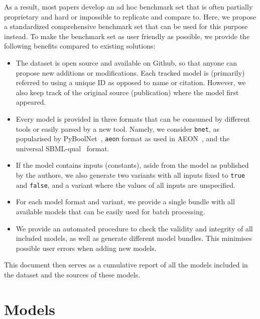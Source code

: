\documentclass{article}
\begin{document}
As a result, most papers develop an ad hoc benchmark set that is often partially proprietary and hard or impossible to replicate and compare to. Here, we propose a standardized comprehensive benchmark set that can be used for this purpose instead. To make the benchmark set as user friendly as possible, we provide the following benefits compared to existing solutions:

\begin{itemize}
	\item The dataset is open source and available on Github, so that anyone can propose new additions or modifications. Each tracked model is (primarily) referred to using a unique ID as opposed to name or citation. However, we also keep track of the original source (publication) where the model first appeared.
	
	\item Every model is provided in three formats that can be consumed by different tools or easily parsed by a new tool. Namely, we consider \texttt{bnet}, as popularised by PyBoolNet~\cite{pyboolnet}, \texttt{aeon} format as used in AEON~\cite{aeon}, and the universal SBML-qual~\cite{sbml-qual} format.
	
	\item If the model contains inputs (constants), aside from the model as published by the authors, we also generate two variants with all inputs fixed to \texttt{true} and \texttt{false}, and a variant where the values of all inputs are unspecified.
	
	\item For each model format and variant, we provide a single bundle with all available models that can be easily used for batch processing.
	
	\item We provide an automated procedure to check the validity and integrity of all included models, as well as generate different model bundles. This minimises possible user errors when adding new models.
\end{itemize}

This document then serves as a cumulative report of all the models included in the dataset and the sources of these models.

\section{Models}
\end{document}
